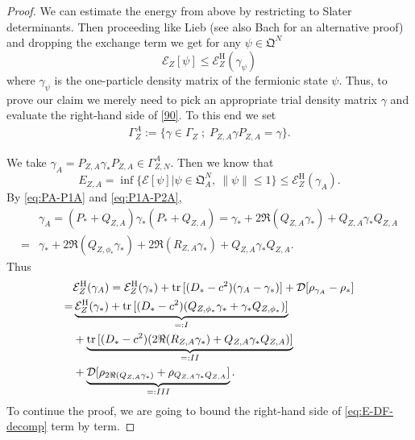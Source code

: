 \documentclass[a4paper]{amsart}
\def\tr{{\rm tr \,}}
\def\cD{\mathcal{D}}
\def\cE{{\mathcal E}}
\def\gQ{\mathfrak{Q}}
\begin{document}
\begin{proof}
We can estimate the energy from above by restricting to Slater
determinants. Then proceeding like Lieb \cite{Lieb1981V} (see also
Bach \cite{Bach1992} for an alternative proof) and dropping the exchange
term we get for any $\psi\in \gQ^N$ 
\begin{equation}
  \label{90}
    \cE_{Z}[\psi] \leq \cE_{Z}^\mathrm{H}(\gamma_\psi)
  \end{equation}
  where $\gamma_\psi$ is the one-particle density matrix of the
  fermionic state $\psi$.  Thus, to prove our claim we merely need to
  pick an appropriate trial density matrix $\gamma$ and evaluate the
  right-hand side of \eqref{90}. To this end we set
  \begin{align}\label{eq:Gamma-A}
     \Gamma_{Z}^A:=\{\gamma\in \Gamma_{Z}\;;\; P_{Z,A} \gamma P_{Z,A}=\gamma\}.
  \end{align}
 

We take $\gamma_A=P_{Z,A}\gamma_* P_{Z,A}\in \Gamma_{Z,N}^A$. Then we know that
\begin{equation}\label{eq:EMN=>EMrhf}
     E_{Z,A}=\inf\{\cE[\psi]|\psi\in\gQ^N_A,\ \|\psi\|\leq1\}\leq \cE_{Z}^\mathrm{H}(\gamma_A).
\end{equation}
By \eqref{eq:PA-P1A} and \eqref{eq:P1A-P2A},
\begin{equation}
  \begin{split}
    \label{eq:93}
    &\gamma_A=(P_*+Q_{Z,A})\gamma_*(P_*+Q_{Z,A})=\gamma_*+2\Re(Q_{Z,A}\gamma_*)
      +Q_{Z,A}\gamma_* Q_{Z,A}\\
    =&\gamma_*+ 2\Re(Q_{Z,\phi_*}\gamma_*)+2\Re(R_{Z,A}\gamma_*)
       + Q_{Z,A}\gamma_* Q_{Z,A}.
  \end{split}
\end{equation}
Thus
\begin{equation}\label{eq:E-DF-decomp}
  \begin{split}
    &\cE^\mathrm{H}_{Z}(\gamma_A)=\cE_{Z}^\mathrm{H}(\gamma_*)+\tr[(D_*-c^2) (\gamma_A-\gamma_*)]+\cD[\rho_{\gamma_A}-\rho_*]\\
    =&\underbrace{\cE_{Z}^\mathrm{H}(\gamma_*)+\tr[(D_*-c^2) (Q_{Z,\phi_*}\gamma_*+\gamma_* Q_{Z,\phi_*})]}_{=:I}\\
    &+\underbrace{\tr[(D_*-c^2) (2\Re(R_{Z,A}\gamma_*)+ Q_{Z,A}\gamma_* Q_{Z,A})]}_{=:II} \\
    &+\underbrace{\cD[\rho_{2\Re(Q_{Z,A}\gamma_*)} +\rho_{Q_{Z,A}\gamma_*Q_{Z,A}}]}_{=:III}.
  \end{split}
\end{equation}
To continue the proof, we are going to bound the right-hand side of \eqref{eq:E-DF-decomp} term by term.


\end{proof}
\end{document}
